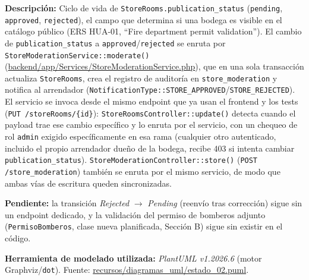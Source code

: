 {\sloppy\noindent\textbf{Descripción:} Ciclo de vida de \texttt{StoreRooms.publication\_status} (\texttt{pending}, \texttt{approved}, \texttt{rejected}), el campo que determina si una bodega es visible en el catálogo público (ERS HUA-01, ``Fire department permit validation''). El cambio de \texttt{publication\_status} a \texttt{approved}/\texttt{rejected} se enruta por \texttt{StoreModerationService::moderate()} (\url{backend/app/Services/StoreModerationService.php}), que en una sola transacción actualiza \texttt{StoreRooms}, crea el registro de auditoría en \texttt{store\_moderation} y notifica al arrendador (\texttt{NotificationType::STORE\_APPROVED}/\texttt{STORE\_REJECTED}). El servicio se invoca desde el mismo endpoint que ya usan el frontend y los tests (\texttt{PUT /storeRooms/\{id\}}): \texttt{StoreRoomsController::update()} detecta cuando el payload trae ese cambio específico y lo enruta por el servicio, con un chequeo de rol \texttt{admin} exigido específicamente en esa rama (cualquier otro autenticado, incluido el propio arrendador dueño de la bodega, recibe 403 si intenta cambiar \texttt{publication\_status}). \texttt{StoreModerationController::store()} (\texttt{POST /store\_moderation}) también se enruta por el mismo servicio, de modo que ambas vías de escritura queden sincronizadas.\par}

\noindent\textbf{Pendiente:} la transición \emph{Rejected} $\to$ \emph{Pending} (reenvío tras corrección) sigue sin un endpoint dedicado, y la validación del permiso de bomberos adjunto (\texttt{PermisoBomberos}, clase nueva planificada, Sección B) sigue sin existir en el código.

\bigskip
{\sloppy\noindent\textbf{Herramienta de modelado utilizada:} \textit{PlantUML v1.2026.6} (motor Graphviz/\texttt{dot}). Fuente: \url{recursos/diagramas_uml/estado_02.puml}.\par}

